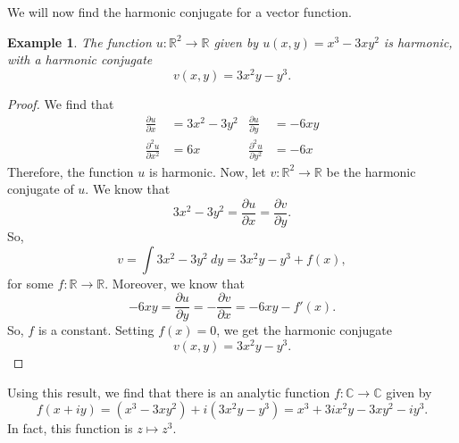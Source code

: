 \documentclass[a4paper, openany]{memoir}
\theoremstyle{definition}
\theoremstyle{plain}
\newtheorem{example}[definition]{Example}
\begin{document}
We will now find the harmonic conjugate for a vector function.
\begin{example}
The function $u: \mathbb{R}^2 \to \mathbb{R}$ given by $u(x, y) = x^3 - 3xy^2$ is harmonic, with a harmonic conjugate
\[v(x, y) = 3x^2y - y^3.\]
\end{example}
\begin{proof}
We find that
\begin{align*}
    \frac{\partial u}{\partial x} &= 3x^2 - 3y^2 & \frac{\partial u}{\partial y} &= -6xy \\
    \frac{\partial^2 u}{\partial x^2} &= 6x & \frac{\partial^2 u}{\partial y^2} &= -6x
\end{align*}
Therefore, the function $u$ is harmonic. Now, let $v: \mathbb{R}^2 \to \mathbb{R}$ be the harmonic conjugate of $u$. We know that
\[3x^2 - 3y^2 = \frac{\partial u}{\partial x} = \frac{\partial v}{\partial y}.\]
So,
\[v = \int 3x^2 - 3y^2 \ dy = 3x^2y - y^3 + f(x),\]
for some $f: \mathbb{R} \to \mathbb{R}$. Moreover, we know that
\[-6xy = \frac{\partial u}{\partial y} = -\frac{\partial v}{\partial x} = -6xy - f'(x).\]
So, $f$ is a constant. Setting $f(x) = 0$, we get the harmonic conjugate
\[v(x, y) = 3x^2y - y^3.\]
\end{proof}
Using this result, we find that there is an analytic function $f: \mathbb{C} \to \mathbb{C}$ given by
\[f(x + iy) = (x^3 - 3xy^2) + i(3x^2y - y^3) = x^3 + 3i x^2y - 3xy^2 -i y^3.\]
In fact, this function is $z \mapsto z^3$.
\end{document}
